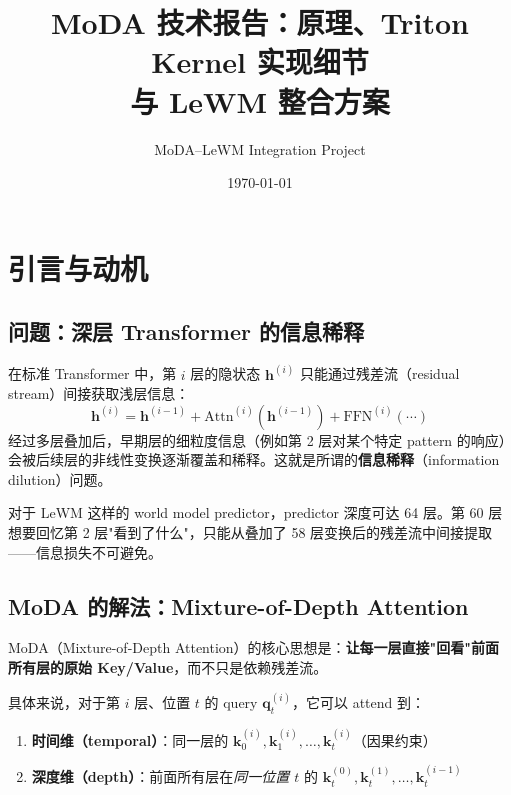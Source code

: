 \documentclass[11pt,a4paper]{article}
\title{\textbf{MoDA 技术报告：原理、Triton Kernel 实现细节\\与 LeWM 整合方案}}
\author{MoDA--LeWM Integration Project}
\date{\today}
\begin{document}
\maketitle
\tableofcontents
\newpage

\section{引言与动机}

\subsection{问题：深层 Transformer 的信息稀释}

在标准 Transformer 中，第 $i$ 层的隐状态 $\mathbf{h}^{(i)}$ 只能通过残差流（residual stream）间接获取浅层信息：
\begin{equation}
  \mathbf{h}^{(i)} = \mathbf{h}^{(i-1)} + \text{Attn}^{(i)}(\mathbf{h}^{(i-1)}) + \text{FFN}^{(i)}(\cdots)
\end{equation}
经过多层叠加后，早期层的细粒度信息（例如第 2 层对某个特定 pattern 的响应）会被后续层的非线性变换逐渐覆盖和稀释。这就是所谓的\textbf{信息稀释}（information dilution）问题。

对于 LeWM 这样的 world model predictor，predictor 深度可达 64 层。第 60 层想要回忆第 2 层"看到了什么"，只能从叠加了 58 层变换后的残差流中间接提取——信息损失不可避免。

\subsection{MoDA 的解法：Mixture-of-Depth Attention}

MoDA（Mixture-of-Depth Attention）的核心思想是：\textbf{让每一层直接"回看"前面所有层的原始 Key/Value}，而不只是依赖残差流。

具体来说，对于第 $i$ 层、位置 $t$ 的 query $\mathbf{q}_t^{(i)}$，它可以 attend 到：
\begin{enumerate}
  \item \textbf{时间维（temporal）}：同一层的 $\mathbf{k}_0^{(i)}, \mathbf{k}_1^{(i)}, \ldots, \mathbf{k}_t^{(i)}$（因果约束）
  \item \textbf{深度维（depth）}：前面所有层在\emph{同一位置 $t$} 的 $\mathbf{k}_t^{(0)}, \mathbf{k}_t^{(1)}, \ldots, \mathbf{k}_t^{(i-1)}$
\end{enumerate}
\end{document}
